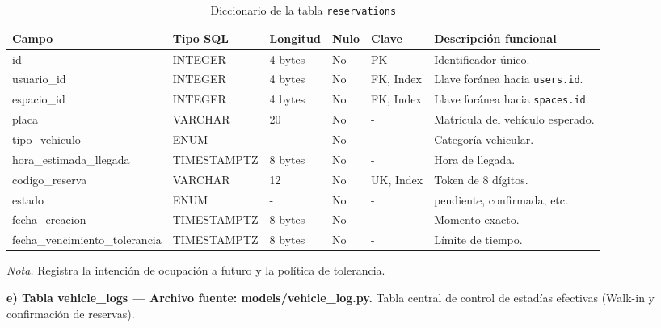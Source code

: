 \begin{table}[htbp]
\caption{Diccionario de la tabla \texttt{reservations}}
\label{tab:dict_reservations}
\begin{tabular}{@{}p{5.5cm} p{3cm} p{1.5cm} p{1cm} p{1.5cm} p{3cm}@{}}
\toprule
\textbf{Campo} & \textbf{Tipo SQL} & \textbf{Longitud} & \textbf{Nulo} & \textbf{Clave} & \textbf{Descripción funcional} \\
\midrule
id & INTEGER & 4 bytes & No & PK & Identificador único. \\
usuario\_id & INTEGER & 4 bytes & No & FK, Index & Llave foránea hacia \texttt{users.id}. \\
espacio\_id & INTEGER & 4 bytes & No & FK, Index & Llave foránea hacia \texttt{spaces.id}. \\
placa & VARCHAR & 20 & No & - & Matrícula del vehículo esperado. \\
tipo\_vehiculo & ENUM & - & No & - & Categoría vehicular. \\
hora\_estimada\_llegada & TIMESTAMPTZ & 8 bytes & No & - & Hora de llegada. \\
codigo\_reserva & VARCHAR & 12 & No & UK, Index & Token de 8 dígitos. \\
estado & ENUM & - & No & - & pendiente, confirmada, etc. \\
fecha\_creacion & TIMESTAMPTZ & 8 bytes & No & - & Momento exacto. \\
fecha\_vencimiento\_tolerancia & TIMESTAMPTZ & 8 bytes & No & - & Límite de tiempo. \\
\bottomrule
\end{tabular}
\par\vspace{0.2cm}
\textit{Nota.} Registra la intención de ocupación a futuro y la política de tolerancia.
\end{table}

\clearpage\textbf{e) Tabla vehicle\_logs — Archivo fuente: models/vehicle\_log.py.} Tabla central de control de estadías efectivas (Walk-in y confirmación de reservas).

